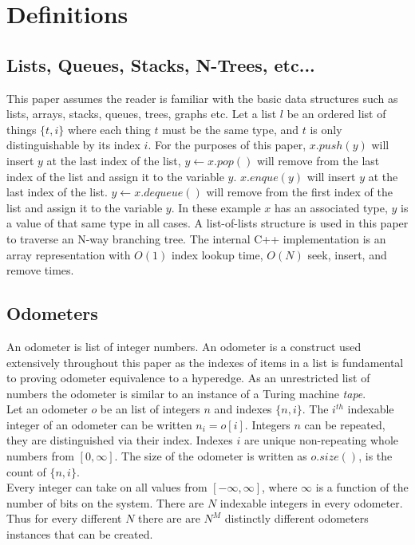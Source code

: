 \chapter{Definitions}

\section{Lists, Queues, Stacks, N-Trees, etc...}
This paper assumes the reader is familiar with the basic data structures such as lists, arrays, stacks, queues, trees, graphs etc. Let a list $l$ be an ordered list of things $\{t,i\}$ where each thing $t$ must be the same type, and $t$ is only distinguishable by its index $i$. For the purposes of this paper, $x.push(y)$ will insert $y$ at the last index of the list, $y \gets x.pop()$ will remove from the last index of the list and assign it to the variable $y$.  $x.enque(y)$ will insert $y$ at the last index of the list. $y \gets x.dequeue()$ will remove from the first index of the list and assign it to the variable $y$. In these example $x$ has an associated type, $y$ is a value of that same type in all cases. A list-of-lists structure is used in this paper to traverse an N-way branching tree. The internal C++ implementation is an array representation with $O(1)$ index lookup time, $O(N)$ seek, insert, and remove times.

\section{Odometers }

An odometer is list of integer numbers. An odometer is a construct used extensively throughout this paper as the indexes of items in a list is fundamental to proving odometer equivalence to a hyperedge. As an unrestricted list of numbers the odometer is similar to an instance of a Turing machine \textit{tape}. \\

Let an odometer $o$ be an list of integers $n$ and indexes $\{n,i\}$. The $i^{th}$ indexable integer of an odometer can be written $n_i = o[i]$. Integers $n$ can be repeated, they are distinguished via their index. Indexes $i$ are unique non-repeating whole numbers from $[0,\infty]$. The size of the odometer is written as $o.size()$, is the count of $\{n,i\}$. \\

Every integer can take on all values from $[-\infty,\infty]$, where $\infty$ is a function of the number of bits on the system. There are $N$ indexable integers in every odometer. Thus for every different $N$ there are are $N^M$ distinctly different odometers instances that can be created.\cite{Odometer:Fuchs}\\


